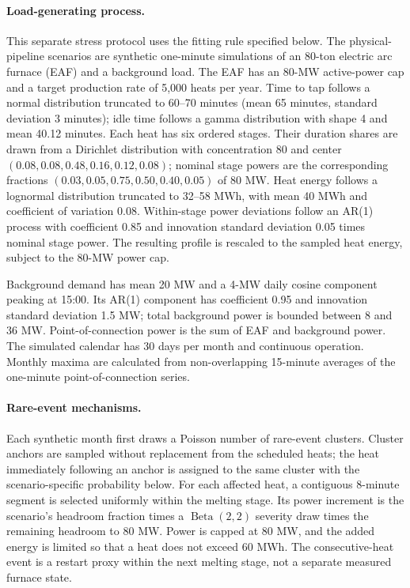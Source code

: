 \documentclass[]{interact}
\begin{document}
\paragraph*{Load-generating process.}
This separate stress protocol uses the fitting rule specified below.
The physical-pipeline scenarios are synthetic one-minute simulations of
an 80-ton electric arc furnace (EAF) and a background load. The EAF has
an 80-MW active-power cap and a target production rate of 5,000 heats
per year. Time to tap follows a normal distribution truncated to
60--70 minutes (mean 65 minutes, standard deviation 3 minutes); idle
time follows a gamma distribution with shape 4 and mean 40.12 minutes.
Each heat has six ordered stages. Their duration shares are drawn from
a Dirichlet distribution with concentration 80 and center
$(0.08,0.08,0.48,0.16,0.12,0.08)$; nominal stage powers are the
corresponding fractions $(0.03,0.05,0.75,0.50,0.40,0.05)$ of 80 MW.
Heat energy follows a lognormal distribution truncated to 32--58 MWh,
with mean 40 MWh and coefficient of variation 0.08. Within-stage power
deviations follow an AR(1) process with coefficient 0.85 and innovation
standard deviation 0.05 times nominal stage power. The resulting
profile is rescaled to the sampled heat energy, subject to the 80-MW
power cap.

Background demand has mean 20 MW and a 4-MW daily cosine component
peaking at 15:00. Its AR(1) component has coefficient 0.95 and
innovation standard deviation 1.5 MW; total background power is bounded
between 8 and 36 MW. Point-of-connection power is the sum of EAF and
background power. The simulated calendar has 30 days per month and
continuous operation. Monthly maxima are calculated from non-overlapping
15-minute averages of the one-minute point-of-connection series.

\paragraph*{Rare-event mechanisms.}
Each synthetic month first draws a Poisson number of rare-event
clusters. Cluster anchors are sampled without replacement from the
scheduled heats; the heat immediately following an anchor is assigned
to the same cluster with the scenario-specific probability below.
For each affected heat, a contiguous 8-minute segment is selected
uniformly within the melting stage. Its power increment is the
scenario's headroom fraction times a $\operatorname{Beta}(2,2)$ severity
draw times the remaining headroom to 80 MW. Power is capped at 80 MW,
and the added energy is limited so that a heat does not exceed 60 MWh.
The consecutive-heat event is a restart proxy within the next melting
stage, not a separate measured furnace state.
\end{document}
